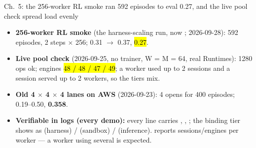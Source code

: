 \begin{frame}{Ch.\ 5: the 256-worker RL smoke ran 592 episodes to eval 0.27, and the live pool check spread load evenly}
\begin{itemize}\footnotesize\setlength{\itemsep}{2.4mm}
\item \textbf{256-worker RL smoke} (the harness-scaling run, now ; 2026-09-28): 592 episodes, 2 steps $\times$ 256;  0.31 $\rightarrow$ 0.37, \hl{ 0.27}.
\item \textbf{Live pool check} (2026-09-25, no trainer, W = M = 64, real Runtimes): 1280 ops ok; engines \hl{48 / 48 / 47 / 49}; a worker used up to 2 sessions and a session served up to 2 workers, so the tiers mix.
\item \textbf{Old 4 $\times$ 4 $\times$ 4 lanes on AWS} (2026-09-23): 4 opens for 400 episodes;  0.19--0.50, \textbf{ 0.358}.
\item \textbf{Verifiable in logs (every demo):} every \cc{[demo]} line carries , , ; the binding tier shows as  (harness) /  (sandbox) /  (inference).  reports sessions/engines per worker --- a worker using several is expected.
\end{itemize}
\end{frame}

